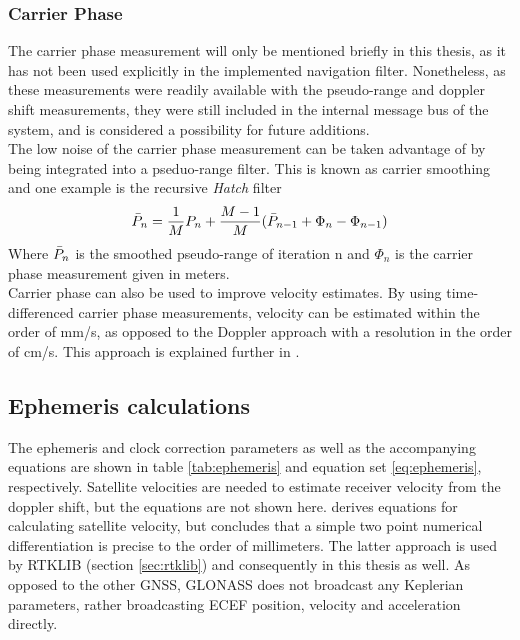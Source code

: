 \subsubsection{Carrier Phase}
The carrier phase measurement will only be mentioned briefly in this thesis, as it has not been used explicitly in the implemented navigation filter. Nonetheless, as these measurements were readily available with the pseudo-range and doppler shift measurements, they were still included in the internal message bus of the system, and is considered a possibility for future additions.\\

The low noise of the carrier phase measurement can be taken advantage of by being integrated into a pseduo-range filter. This is known as carrier smoothing and one example is the recursive \textit{Hatch} filter \cite{misra2006global}
\begin{equation}
    \Bar{P}_n = \frac{1}{M}P_n + \frac{M-1}{M}(\Bar{P}_{n-1} + \Phi_n - \Phi_{n-1})
\end{equation}
Where $\Bar{P}_n$ is the smoothed pseudo-range of iteration n and $\Phi_n$ is the carrier phase measurement given in meters.\\

Carrier phase can also be used to improve velocity estimates. By using time-differenced carrier phase measurements, velocity can be estimated within the order of mm/s, as opposed to the Doppler approach with a resolution in the order of cm/s. This approach is explained further in \cite{freda2015time}.


\subsection{Ephemeris calculations}
\label{sec:ephemeris}
The ephemeris and clock correction parameters as well as the accompanying equations are shown in table \ref{tab:ephemeris} and equation set \ref{eq:ephemeris}, respectively. Satellite velocities are needed to estimate receiver velocity from the doppler shift, but the equations are not shown here. \cite{zhang2006gps} derives equations for calculating satellite velocity, but concludes that a simple two point numerical differentiation is precise to the order of millimeters. The latter approach is used by RTKLIB (section \ref{sec:rtklib}) and consequently in this thesis as well. As opposed to the other GNSS, GLONASS does not broadcast any Keplerian parameters, rather broadcasting ECEF position, velocity and acceleration directly. \cite{groves2013principles}\\

